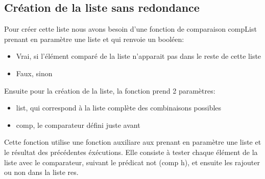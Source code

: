 \documentclass[a4paper,twoside,12pt]{report}
\begin{document}
\subsection{Création de la liste sans redondance}
\par
Pour créer cette liste nous avons besoin d'une fonction de comparaison compList prenant en paramètre une liste et qui renvoie un booléen:
\begin{itemize}
\item Vrai, si l'élément comparé de la liste n'apparait pas dans le reste de cette liste
\item Faux, sinon
\end{itemize}
Ensuite pour la création de la liste, la fonction prend 2 paramètres:
\begin{itemize}
\item list, qui correspond à la liste complète des combinaisons possibles
\item comp, le comparateur défini juste avant
\end{itemize}
\par
Cette fonction utilise une fonction auxiliare aux prenant en paramètre une liste et le résultat des précédentes éxécutions. Elle consiste à tester chaque élément  de la liste avec le comparateur, suivant le prédicat not (comp h),  et ensuite les rajouter ou non dans la liste res.
\end{document}
